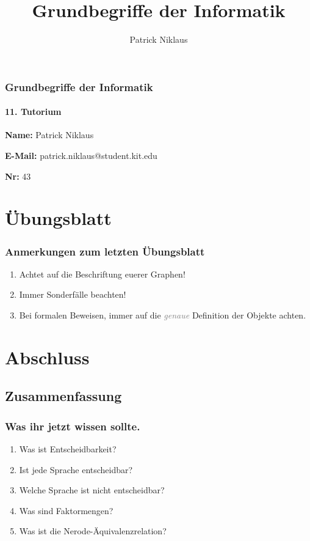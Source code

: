 \documentclass{beamer}
\title{Grundbegriffe der Informatik}
\author{Patrick Niklaus}
\renewcommand{\emph}[1]{\textit{\textcolor{gray}{#1}}}
\begin{document}
\begin{frame}
  \frametitle{Grundbegriffe der Informatik}
  \framesubtitle{11. Tutorium}
  \begin{description}
    \item \textbf{Name:} Patrick Niklaus
    \item \textbf{E-Mail:} patrick.niklaus@student.kit.edu
    \item \textbf{Nr:} 43
  \end{description}
\end{frame}

\section{Übungsblatt}
\begin{frame}
  \frametitle{Anmerkungen zum letzten Übungsblatt}
  \begin{enumerate}
    \item Achtet auf die Beschriftung euerer Graphen!
    \item Immer Sonderfälle beachten!
    \item Bei formalen Beweisen, immer auf die \emph{genaue} Definition der Objekte achten.
  \end{enumerate}
\end{frame}




\section{Abschluss}
\subsection{Zusammenfassung}
\begin{frame}
  \frametitle{Was ihr jetzt wissen sollte.}
  \begin{enumerate}
    \item Was ist Entscheidbarkeit?
    \item Ist jede Sprache entscheidbar?
    \item Welche Sprache ist nicht entscheidbar?
    \item Was sind Faktormengen?
    \item Was ist die Nerode-Äquivalenzrelation?
  \end{enumerate}
\end{frame}
\end{document}
